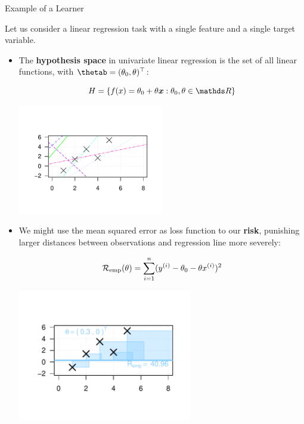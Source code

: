 \documentclass[11pt,compress,t,notes=noshow, xcolor=table]{beamer}
\begin{document}
\begin{vbframe}{Example of a Learner}

Let us consider a linear regression task with 
a single feature and a single target variable.

\begin{itemize}
  
  \item The \textbf{hypothesis space} in univariate linear regression is the set 
  of all linear functions, with $\thetab = (\theta_0, \theta)^\top$:
  
  $$\Hspace = \{\fx = \theta_0 + \theta \xv: \theta_0, \theta \in \R \}$$
  
  \begin{center}
    \includegraphics[trim = 1.5cm 1.5cm 1.5cm 1.5cm, width = 0.5\textwidth]{figure/lm_reg3} 
  \end{center}
  
  \framebreak
  
  \item We might use the mean squared error as loss function to our
  \textbf{risk}, punishing larger distances between observations and regression 
  line more severely:
  
  $$\mathcal{R}_{\text{emp}}(\theta) = \sum_{i=1}^n (y^{(i)} - \theta_0 - \theta x^{(i)})^2$$
  
  \begin{center}
    \includegraphics[trim = 1.5cm 1.5cm 1.5cm 1.5cm, width = 0.6\textwidth]{figure/lm_reg1} 
  \end{center}
  

\end{itemize}
\end{vbframe}
\end{document}
